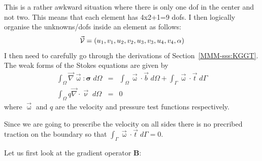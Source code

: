 This is a rather awkward situation where there is only one dof in the center and not two. 
This means that each element has 4x2+1=9 dofs. 
I then logically organise the unknowns/dofs inside an element as follows:
\[
\vec{\cal V}=(u_1,v_1,u_2,v_2,u_3,v_3,u_4,v_4,\alpha)
\]
I then need to carefully go through the derivations of Section~\ref{MMM-sss:KGGT}.
The weak forms of the Stokes equations are given by
\begin{eqnarray}
\int_\Omega \vec\nabla \vec{\upomega} : {\bm \sigma} \; d\Omega
&=& \int_\Omega \vec\upomega \cdot \vec{b} \; d\Omega 
+ \int_\Gamma \vec\upomega \cdot \vec{t} \; d\Gamma \\
\int_\Omega q \vec\nabla \cdot \vec{\upnu} \; d\Omega &=& 0
\end{eqnarray}
where $\vec\upomega$ and $q$ are the velocity and pressure test functions respectively. 

Since we are going to prescribe the velocity on all sides there is no precribed 
traction on the boundary so that $\int_\Gamma \vec\upomega \cdot \vec{t} \; d\Gamma=0$.

Let us first look at the gradient operator ${\bm B}$:

